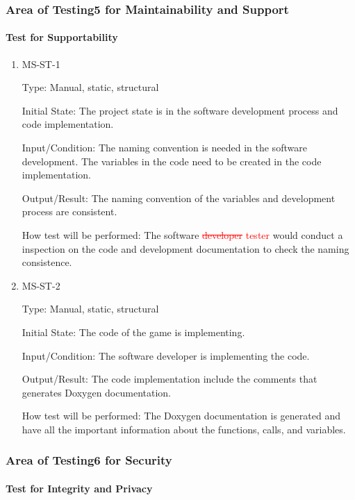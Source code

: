 \documentclass[12pt, titlepage]{article}
\begin{document}
\subsubsection{Area of Testing5 for Maintainability and Support}
\paragraph{Test for Supportability}

\begin{enumerate}

\item{MS-ST-1\\}

Type: Manual, static, structural
					
Initial State: The project state is in the software development process and code implementation.
					
Input/Condition: The naming convention is needed in the software development. The variables in the code need to be created in the code implementation.
					
Output/Result: The naming convention of the variables and development process are consistent.
					
How test will be performed: The software  \textcolor{red}{\sout{developer} tester} would conduct a inspection on the code and development documentation to check the naming consistence.

\item{MS-ST-2\\}

Type: Manual, static, structural
					
Initial State: The code of the game is implementing.
					
Input/Condition: The software developer is implementing the code.
					
Output/Result: The code implementation include the comments that generates Doxygen documentation.
					
How test will be performed: The Doxygen documentation is generated and have all the important information about the functions, calls, and variables.

\end{enumerate}

\subsubsection{Area of Testing6 for Security}
\paragraph{Test for Integrity and Privacy}
\end{document}
